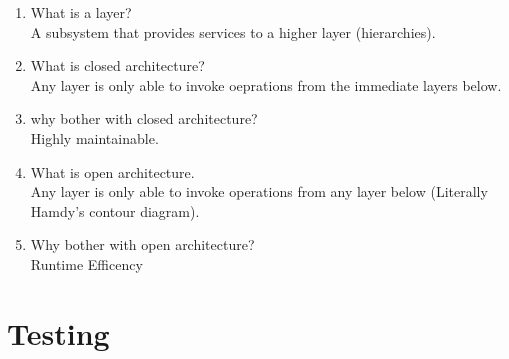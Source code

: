 \documentclass[10pt]{article}
\begin{document}
\begin{enumerate}
      \item What is a layer?\\
            A subsystem that provides services to a higher layer (hierarchies).

      \item What is closed architecture?\\
            Any layer is only able to invoke oeprations from the immediate layers below.

      \item why bother with closed architecture?\\
            Highly maintainable.\\

      \item What is open architecture.\\
            Any layer is only able to invoke operations from any layer below (Literally Hamdy's contour diagram).\\

      \item Why bother with open architecture?\\
            Runtime Efficency\\

\end{enumerate}

\section{Testing}
\end{document}
